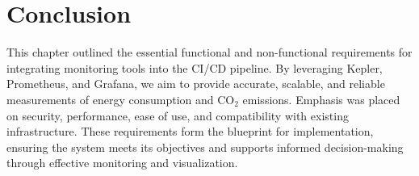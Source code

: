 \section{Conclusion}

This chapter outlined the essential functional and non-functional requirements for integrating monitoring tools into the CI/CD pipeline. By leveraging Kepler, Prometheus, and Grafana, we aim to provide accurate, scalable, and reliable measurements of energy consumption and CO$_2$ emissions. Emphasis was placed on security, performance, ease of use, and compatibility with existing infrastructure. These requirements form the blueprint for implementation, ensuring the system meets its objectives and supports informed decision-making through effective monitoring and visualization.



















